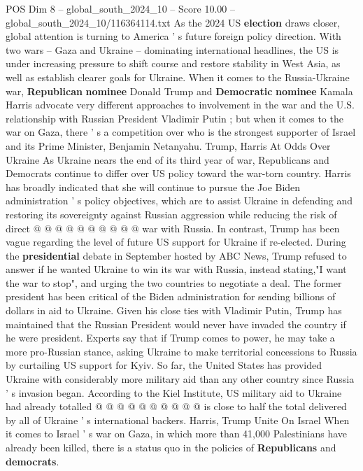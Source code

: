 \begin{textsample}{POS Dim 8 – global\_south\_2024\_10 – Score 10.00 – global\_south\_2024\_10/116364114.txt}  \label{ex:f8_pos_264}
As the 2024 US \textbf{election} draws closer, global attention is turning to America ' s future foreign policy direction.
With two wars -- Gaza and Ukraine -- dominating international headlines, the US is under increasing pressure to shift course and restore stability in West Asia, as well as establish clearer goals for Ukraine.
When it comes to the Russia-Ukraine war, \textbf{Republican} \textbf{nominee} Donald Trump and \textbf{Democratic} \textbf{nominee} Kamala Harris advocate very different approaches to involvement in the war and the U.S. relationship with Russian President Vladimir Putin ; but when it comes to the war on Gaza, there ' s a competition over who is the strongest supporter of Israel and its Prime Minister, Benjamin Netanyahu.
Trump, Harris At Odds Over Ukraine As Ukraine nears the end of its third year of war, Republicans and Democrats continue to differ over US policy toward the war-torn country.
Harris has broadly indicated that she will continue to pursue the Joe Biden administration ' s policy objectives, which are to assist Ukraine in defending and restoring its sovereignty against Russian aggression while reducing the risk of direct @ @ @ @ @ @ @ @ @ @ war with Russia.
In contrast, Trump has been vague regarding the level of future US support for Ukraine if re-elected.
During the \textbf{presidential} debate in September hosted by ABC News, Trump refused to answer if he wanted Ukraine to win its war with Russia, instead stating,"I want the war to stop", and urging the two countries to negotiate a deal.
The former president has been critical of the Biden administration for sending billions of dollars in aid to Ukraine.
Given his close ties with Vladimir Putin, Trump has maintained that the Russian President would never have invaded the country if he were president.
Experts say that if Trump comes to power, he may take a more pro-Russian stance, asking Ukraine to make territorial concessions to Russia by curtailing US support for Kyiv.
So far, the United States has provided Ukraine with considerably more military aid than any other country since Russia ' s invasion began.
According to the Kiel Institute, US military aid to Ukraine had already totalled @ @ @ @ @ @ @ @ @ @ is close to half the total delivered by all of Ukraine ' s international backers.
Harris, Trump Unite On Israel When it comes to Israel ' s war on Gaza, in which more than 41,000 Palestinians have already been killed, there is a status quo in the policies of \textbf{Republicans} and \textbf{democrats}.

\end{textsample}
